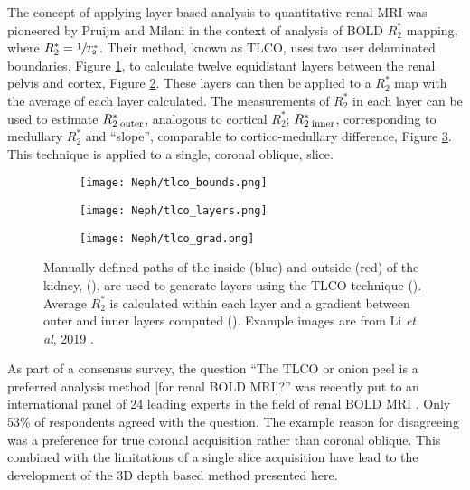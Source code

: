 The concept of applying layer based analysis to quantitative renal \ac{MRI} was pioneered by Pruijm and Milani \cite{piskunowicz_new_2015, milani_reduction_2017, pruijm_blood_2017, li_renal_2019} in the context of analysis of \ac{BOLD} $R_2^*$ mapping, where $R_2^*=\sfrac{1}{T_2^*}$. Their method, known as \ac{TLCO}, uses two user delaminated boundaries, Figure \ref{fig:ex_tlco_bounds}, to calculate twelve equidistant layers between the renal pelvis and cortex, Figure \ref{fig:ex_tlco_layers}. These layers can then be applied to a $R_2^*$ map with the average of each layer calculated. The measurements of $R_2^*$ in each layer can be used to estimate $R_{2\;\textup{outer}}^*$, analogous to cortical $R_2^*$; $R_{2\;\textup{inner}}^*$, corresponding to medullary $R_2^*$ and ``slope'', comparable to  cortico-medullary difference, Figure \ref{fig:ex_tlco_grad}. This technique is applied to a single, coronal oblique, slice.

\begin{figure}[H]
	\centering
	\begin{subfigure}[c]{0.23\textwidth}
		\centering
		\texttt{[image: Neph/tlco\_bounds.png]}
		\caption{}
		\label{fig:ex_tlco_bounds}
	\end{subfigure}
	\hfill
	\begin{subfigure}[c]{0.23\textwidth}
		\centering
		\texttt{[image: Neph/tlco\_layers.png]}
		\caption{}
		\label{fig:ex_tlco_layers}
	\end{subfigure}
	\hfill
	\begin{subfigure}[c]{0.47\textwidth}
		\centering
		\texttt{[image: Neph/tlco\_grad.png]}
		\caption{}
		\label{fig:ex_tlco_grad}
	\end{subfigure}
	\caption{Manually defined paths of the inside (blue) and outside (red) of the kidney, (), are used to generate layers using the \ac{TLCO} technique (). Average $R_2^*$ is calculated within each layer and a gradient between outer and inner layers computed (). Example images are from Li \textit{et al}, 2019 \cite{li_renal_2019}.}
	\label{fig:ex_tlco}
\end{figure}

As part of a consensus survey, the question ``The \ac{TLCO} or onion peel is a preferred analysis method [for renal \ac{BOLD} \ac{MRI}]?'' was recently put to an international panel of 24 leading experts in the field of renal \ac{BOLD} \ac{MRI} \cite{bane_consensus-based_2020}. Only 53\% of respondents agreed with the question. The example reason for disagreeing was a preference for true coronal acquisition rather than coronal oblique. This combined with the limitations of a single slice acquisition have lead to the development of the 3D depth based method presented here.

